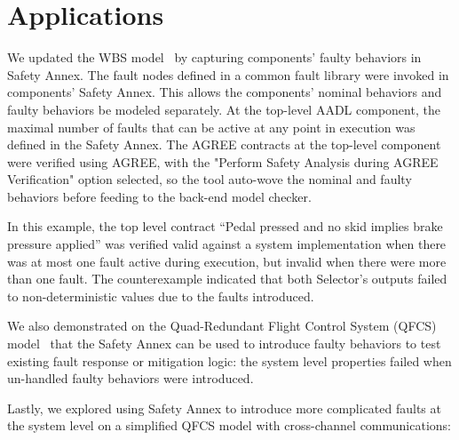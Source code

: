 \section{Applications}

We updated the WBS model~\cite{Stewart17:IMBSA} by capturing components' faulty behaviors in Safety Annex. The fault nodes defined in a common fault library were invoked in components' Safety Annex. This allows the components' nominal behaviors and faulty behaviors be modeled separately. At the top-level AADL component, the maximal number of faults that can be active at any point in execution was defined in the Safety Annex. The AGREE contracts at the top-level component were verified using AGREE, with the "Perform Safety Analysis during AGREE Verification" option selected, so the tool auto-wove the nominal and faulty behaviors before feeding to the back-end model checker.

In this example, the top level contract ``Pedal pressed and no skid implies brake pressure applied'' was verified valid against a system implementation when there was at most one fault active during execution, but invalid when there were more than one fault. The counterexample indicated that both Selector's outputs failed to non-deterministic values due to the faults introduced.

We also demonstrated on the Quad-Redundant Flight Control System (QFCS) model~\cite{QFCS15:backes} that the Safety Annex can be used to introduce faulty behaviors to test existing fault response or mitigation logic: the system level properties failed when un-handled faulty behaviors were introduced.

Lastly, we explored using Safety Annex to introduce more complicated faults at the system level on a simplified QFCS model with cross-channel communications:

